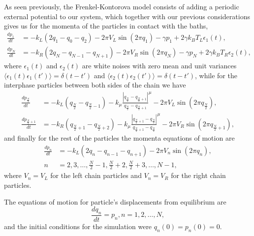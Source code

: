 As seen previously, the Frenkel-Kontorova model consists of adding a periodic external potential to our system, which together with our previous considerations gives us for the momenta of the particles in contact with the baths,
\begin{align*}
\frac{d p_{1} }{d t}&=
-k_{L}(2q_{1}-q_{0}-q_{2}) - 2\pi V_{L}\sin\left(2\pi q_{1}\right)
-\gamma p_{1} + 2\gamma k_{B}T_{L}\epsilon_{1}(t),\\
\frac{d p_{N} }{d t}&=
-k_{R}(2q_{N}-q_{N-1}-q_{N+1})-2\pi V_{R}\sin\left(2\pi q_{N}\right)
-\gamma p_{N} + 2\gamma k_{B}T_{R} \epsilon_{2}(t),
\end{align*}
where $ \epsilon_{1}(t) $ and $ \epsilon_{2}(t) $ are white noises with zero mean and unit variances $ \langle \epsilon_{1}(t) \epsilon_{1}(t') \rangle = \delta(t-t')$ and $ \langle \epsilon_{2}(t)\epsilon_{2}(t') \rangle = \delta(t-t')$, while for the interphase particles between both sides of the chain we have
\begin{align*}
\frac{d p_{\frac{N}{2}}}{d t}&=
-k_{L}(q_{\frac{N}{2}}-q_{\frac{N}{2}-1}) 
-k_{\mu} \frac{\left|q_{\frac{N}{2}}-q_{\frac{N}{2}+1}\right|}
{q_{\frac{N}{2}}-q_{\frac{N}{2}+1}}^{\mu}
-2\pi V_{L}\sin\left(2\pi q_{\frac{N}{2}}\right),\\
\frac{d p_{\frac{N}{2}+1} }{d t}&=
-k_{R}(q_{\frac{N}{2}+1}-q_{\frac{N}{2}+2}) 
-k_{\mu} \frac{\left|q_{\frac{N}{2}+1}-q_{\frac{N}{2}}\right|}
{q_{\frac{N}{2}+1}-q_{\frac{N}{2}}}^{\mu}
-2\pi V_{R}\sin\left(2\pi q_{\frac{N}{2}+1}\right),
\end{align*} 
and finally for the rest of the particles the momenta equations of motion are
\begin{align*}
\frac{d p_{n} }{d t}&= 
-k_{L}(2q_{n}-q_{n-1}-q_{n+1})-2\pi V_{n}\sin\left(2\pi q_{n}\right),\\
n&=2,3,\dots,\frac{N}{2}-1,\frac{N}{2}+2,\frac{N}{2}+3,\dots,N-1,
\end{align*}
where $ V_{n}=V_{L} $ for the left chain particles and $ V_{n}=V_{R} $ for the right chain particles.

The equations of motion for particle's displacements from equilibrium are 
\[ 
\frac{dq_{n} }{dt} = p_{n}, n=1,2,\dots,N,
\]
and the initial conditions for the simulation were $ q_{n}(0)=p_{n}(0)=0 $.


